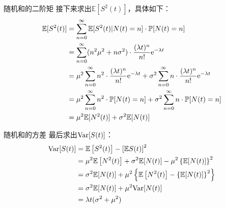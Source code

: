 \documentclass[t]{beamer}
\renewcommand{\Pr}{\mathbb{P}}
\newcommand{\E}{\mathbb{E}}
\newcommand{\Var}{{\rm Var}}
\begin{document}
\begin{frame}{随机和的二阶矩}
    接下来求出$\E[S^2(t)]$，具体如下：
    \[\begin{split}
    \E[S^2(t)]&= \sum^{\infty}_{n=0}\E[S^2(t)|N(t)=n]\cdot \Pr[N(t)=n]\\
    &=  \sum^{\infty}_{n=0}(n^2\mu^2+n\sigma^2)\cdot \frac{(\lambda t)^n}{n!}{\rm e}^{-\lambda t}\\
        &=\mu^2  \sum^{\infty}_{n=0}  n^2\cdot\frac{(\lambda t)^n}{n!}{\rm e}^{-\lambda t}+\sigma^2 \sum^{\infty}_{n=0}  n\cdot\frac{(\lambda t)^n}{n!}{\rm e}^{-\lambda t}  \\
        &=\mu^2  \sum^{\infty}_{n=0}  n^2\cdot \Pr[N(t)=n]   +\sigma^2 \sum^{\infty}_{n=0}  n \cdot \Pr[N(t)=n]   \\
    &=\mu^2 \E[N^2(t)]+\sigma^2 \E[N(t)]
    \end{split} \]
\end{frame}


\begin{frame}{随机和的方差}
    最后求出$\Var[S(t)]$：
    \[\begin{split}
    \Var[S(t)]&= \E\left[S^2(t)\right]-\left[\E S(t) \right]^2\\
    &=\mu^2 \E\left[N^2(t) \right]+\sigma^2 \E[N(t)]-\mu^2 \left\{\E[N(t)] \right\}^2\\
    &=\sigma^2 \E[N(t)]+\mu^2\left\{ \E\left[N^2(t)\right]-\left\{\E[N(t)] \right\}^2 \right\}
    \\
    &=\sigma^2 \E[N(t)]+\mu^2 \Var[N(t)]\\
    &=\lambda t(\sigma^2+\mu^2)
    \end{split} \]  
\end{frame}
\end{document}
